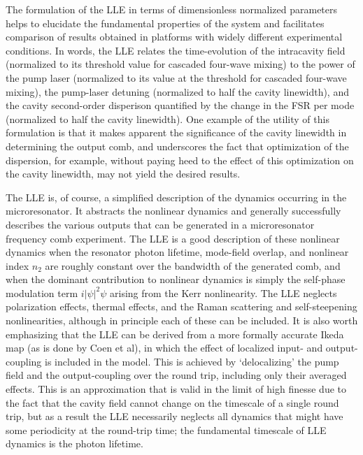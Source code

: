 The formulation of the LLE in terms of dimensionless normalized parameters helps to elucidate the fundamental properties of the system and facilitates comparison of results obtained in platforms with widely different experimental conditions. In words, the LLE relates the time-evolution of the intracavity field (normalized to its threshold value for cascaded four-wave mixing) to the power of the pump laser (normalized to its value at the threshold for cascaded four-wave mixing), the pump-laser detuning (normalized to half the cavity linewidth), and the cavity second-order disperison quantified by the change in the FSR per mode (normalized to half the cavity linewidth). One example of the utility of this formulation is that it makes apparent the significance of the cavity linewidth in determining the output comb, and underscores the fact that optimization of the dispersion, for example, without paying heed to the effect of this optimization on the cavity linewidth, may not yield the desired results.

The LLE is, of course, a simplified description of the dynamics occurring in the microresonator. It abstracts the nonlinear dynamics and generally successfully describes the various outputs that can be generated in a microresonator frequency comb experiment. The LLE is a good description of these nonlinear dynamics when the resonator photon lifetime, mode-field overlap, and nonlinear index $n_2$ are roughly constant over the bandwidth of the generated comb, and when the dominant contribution to nonlinear dynamics is simply the self-phase modulation term $i|\psi|^2\psi$ arising from the Kerr nonlinearity. The LLE neglects polarization effects, thermal effects, and the Raman scattering and self-steepening nonlinearities, although in principle each of these can be included. It is also worth emphasizing that the LLE can be derived from a more formally accurate Ikeda map (as is done by Coen et al), in which the effect of localized input- and output-coupling is included in the model. This is achieved by `delocalizing' the pump field and the output-coupling over the round trip, including only their averaged effects. This is an approximation that is valid in the limit of high finesse due to the fact that the cavity field cannot change on the timescale of a single round trip, but as a result the LLE necessarily neglects all dynamics that might have some periodicity at the round-trip time; the fundamental timescale of LLE dynamics is the photon lifetime. 

